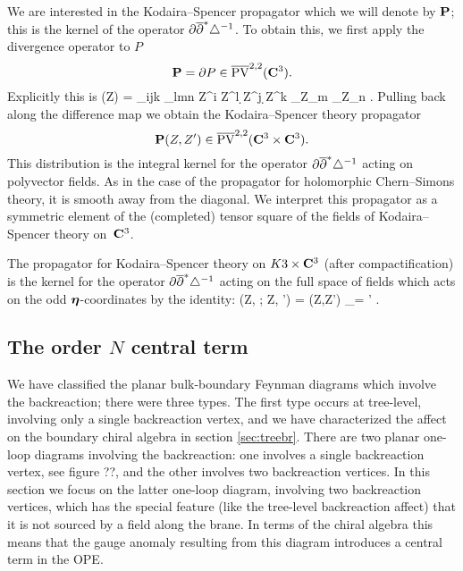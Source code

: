 \documentclass[../main.tex]{subfiles}
\begin{document}
We are interested in the Kodaira--Spencer propagator which we will denote by $\bf P$; this is the kernel of the operator $\partial \overline{\partial}^* \triangle^{-1}$. 
To obtain this, we first apply the divergence operator to $P$ 
\[
\mathbf{P} = \partial P \in \overline{{\rm PV}}^{2,2}(\mathbf{C}^3) .
\]
Explicitly this is
\beqn
\bP (Z) =  \ep_{ijk} \ep_{lmn} \br Z^{i} \br Z^l \d \br Z^j \d \br Z^k \del_{Z_m} \del_{Z_n} .
\eeqn
Pulling back along the difference map we obtain the Kodaira--Spencer theory propagator
\[
\mathbf{P} (Z,Z') \in \overline{{\rm PV}}^{2,2}(\mathbf{C}^3 \times \mathbf{C}^3) .
\]
This distribution is the integral kernel for the operator $\partial \overline{\partial}^* \triangle^{-1}$ acting on polyvector fields. 
As in the case of the propagator for holomorphic Chern--Simons theory, it is smooth away from the diagonal. 
We interpret this propagator as a symmetric element of the (completed) tensor square of the fields of Kodaira--Spencer theory on~$\mathbf{C}^3$. 

The propagator for Kodaira--Spencer theory on $K3 \times \mathbf{C}^3$ (after compactification) is the kernel for the operator $\partial \overline{\partial}^* \triangle^{-1}$ acting on the full space of fields which acts on the odd $\boldsymbol\eta$-coordinates by the identity:
\beqn
\bP(Z, \bfeta ; Z, \bfeta') = \bP(Z,Z') \delta_{\bfeta = \bfeta'} .
\eeqn

\subsection{The order $N$ central term} 
\label{sec:oneloop}

We have classified the planar bulk-boundary Feynman diagrams which involve the backreaction; there were three types.
The first type occurs at tree-level, involving only a single backreaction vertex, and we have characterized the affect on the boundary chiral algebra in section \ref{sec:treebr}.
There are two planar one-loop diagrams involving the backreaction: one involves a single backreaction vertex, see figure ??, and the other involves two backreaction vertices.
In this section we focus on the latter one-loop diagram, involving two backreaction vertices, which has the special feature (like the tree-level backreaction affect) that it is not sourced by a field along the brane.
In terms of the chiral algebra this means that the gauge anomaly resulting from this diagram introduces a central term in the OPE.
\end{document}
